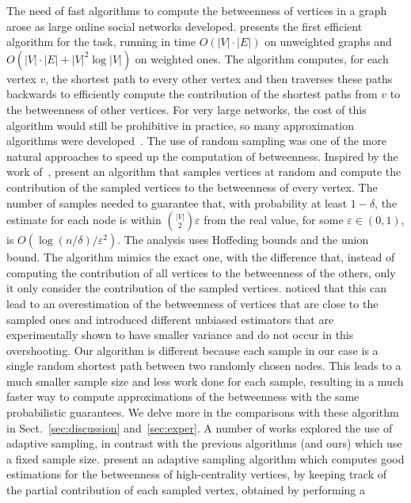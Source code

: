 The need of fast algorithms to compute the betweenness of vertices in a graph
arose as large online social networks developed. \citet{Brandes01} presents the
first efficient algorithm for the task, running in time $O(|V|\cdot|E|)$ on
unweighted graphs and $O(|V|\cdot|E|+|V|^2\log|V|)$ on weighted ones. The
algorithm computes, for each vertex $v$, the shortest path to every other vertex
and then traverses these paths backwards to efficiently compute the contribution
of the shortest paths from $v$ to the betweenness of other vertices. For very
large networks, the cost of this algorithm would still be prohibitive in
practice, so many approximation algorithms were
developed~\citep{JacobKLPT05,BrandesP07,BaderKMM07,GeisbergerSS08,MaiyaBW10,LimMRTB11}.
The use of random sampling was one of the more natural approaches to speed up
the computation of betweenness. Inspired by the work of~\citet{EppsteinW04},
\citet{JacobKLPT05,BrandesP07} present an algorithm that samples vertices at
random and compute the contribution of the sampled vertices to the betweenness
of every vertex. The number of samples needed to guarantee that, with
probability at least $1-\delta$, the estimate for each node is within
$\binom{|V|}{2}\varepsilon$ from the real value, for some $\varepsilon\in(0,1)$,
is $O(\log(n/\delta)/\varepsilon^2)$. The analysis uses Hoffeding bounds and the
union bound. The algorithm mimics the exact one, with the difference
that, instead of computing the contribution of all vertices to the betweenness
of the others, only it only consider the contribution of the sampled vertices.
\citet{GeisbergerSS08} noticed that this can lead to an overestimation of the
betweenness of vertices that are close to the sampled ones and introduced
different unbiased estimators that are experimentally shown to have smaller
variance and do not occur in this overshooting. Our algorithm is different
because each sample in our case is a single random shortest path between two
randomly chosen nodes. This leads to a much smaller sample size and less work
done for each sample, resulting in a much faster way to compute approximations
of the betweenness with the same probabilistic guarantees. We delve more in the
comparisons with these algorithm in Sect.~\ref{sec:discussion}
and~\ref{sec:exper}. A number of works explored the use of adaptive sampling, in
contrast with the previous algorithms (and ours) which use a fixed sample size.
\citet{BaderKMM07} present an adaptive sampling algorithm which computes good
estimations for the betweenness of high-centrality vertices, by keeping track of
the partial contribution of each sampled vertex, obtained by performing a
